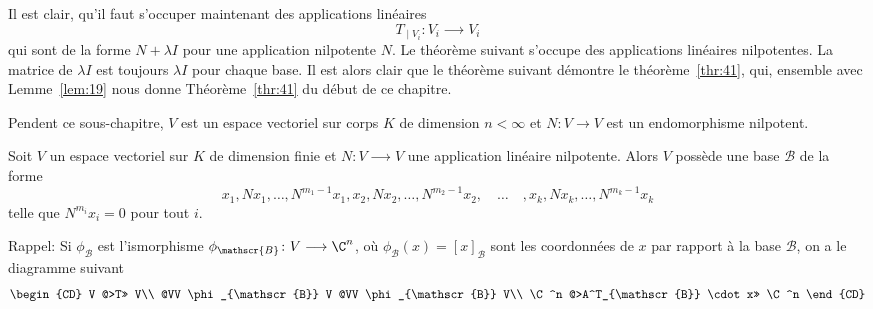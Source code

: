 \medskip 
\noindent 
Il est clair, qu'il faut s'occuper maintenant des applications linéaires 
\begin{displaymath}
  T_{∣V_i} \colon V_i ⟶ V_i 
\end{displaymath}
qui sont de la forme $N + λ I$ pour une application nilpotente $N$. Le théorème suivant s'occupe des applications linéaires nilpotentes. La matrice de $λI$ est toujours $λ I$ pour chaque base. Il est alors clair que le théorème suivant démontre le théorème~\ref{thr:41}, qui, ensemble avec Lemme~\ref{lem:19} nous donne Théorème~\ref{thr:41} du début de ce chapitre. 


\bigskip
\noindent
{\scriptsize  
Pendent ce sous-chapitre, $V$ est un espace vectoriel sur corps $K$ de dimension $n< ∞$ et $N: V → V$ est un endomorphisme nilpotent.
}
\begin{theorem}
  \label{thr:38}
  Soit $V$ un espace vectoriel sur $K$ de dimension finie et $N\colon V ⟶V$  une application linéaire nilpotente.  Alors $V$ possède une base $ℬ$ de la forme 
  \begin{displaymath}
    x_1,Nx_1, \dots, N^{m_1-1}x_1, x_2,Nx_2, \ldots , N^{m_2-1}x_2, \quad \dots \quad , x_k,Nx_k, \dots, N^{m_k-1}x_k
  \end{displaymath}
telle que $N^{m_i}x_i = 0$ pour tout $i$. 
\end{theorem}

{\scriptsize
  \noindent 
Rappel: Si  $\phi_{\mathscr{B}}$ est l'ismorphisme $\phi_{\mathscr{B}} \colon V \longrightarrow \C^n$, où $\phi_{\mathscr{B}}(x) = [x]_{\mathscr{B}}$ sont les coordonnées de $x$ par rapport à la base ${\mathscr{B}}$,  on a le diagramme suivant 
\begin{displaymath}
  {
  \begin{CD}
    V     @>T>>  V\\
    @VV \phi_{\mathscr{B}} V        @VV \phi_{\mathscr{B}} V\\ 
    \C^n     @>A^T_{\mathscr{B}} \cdot x>>  \C^n
  \end{CD}} 
\end{displaymath} 
}

